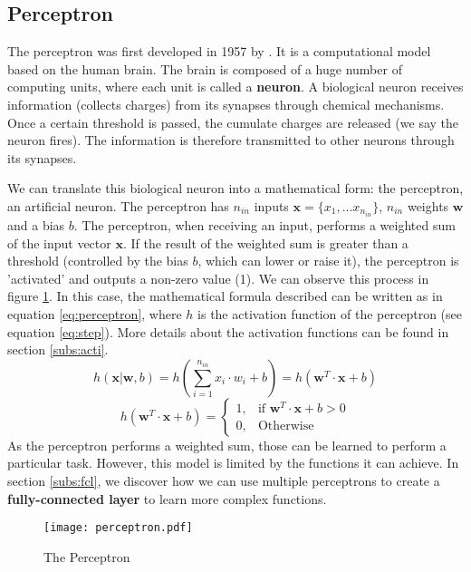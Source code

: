 \subsection{Perceptron} \label{subs:perceptron}
The perceptron was first developed in 1957 by \textcite{brain_perceptron_nodate}. It is a computational model based on the human brain. The brain is composed of a huge number of computing units, where each unit is called a \textbf{neuron}. A biological neuron receives information (collects charges) from its synapses through chemical mechanisms. Once a certain threshold is passed, the cumulate charges are released (we say the neuron fires). The information is therefore transmitted to other neurons through its synapses.

We can translate this biological neuron into a mathematical form: the perceptron, an artificial neuron. The perceptron has $n_{in}$ inputs $\boldsymbol{x} = \{ x_1, ... x_{n_{in}} \}$, $n_{in}$ weights $\boldsymbol{w}$ and a bias $b$. The perceptron, when receiving an input, performs a weighted sum of the input vector $\boldsymbol{x}$. If the result of the weighted sum is greater than a threshold (controlled by the bias $b$, which can lower or raise it), the perceptron is 'activated' and outputs a non-zero value (1). We can observe this process in figure \ref{fig:perceptron}.
In this case, the mathematical formula described can be written as in equation \ref{eq:perceptron}, where $h$ is the activation function of the perceptron (see equation \ref{eq:step}). More details about the activation functions can be found in section \ref{subs:acti}.
%
\begin{equation}
    h ( \boldsymbol{x} | \boldsymbol{w}, b) = h(\sum^{n_{in}}_{i=1} x_i \cdot w_i + b) = h ( \boldsymbol{w}^{T} \cdot \boldsymbol{x} + b)
    \label{eq:perceptron}
\end{equation}
%
\begin{equation}
    h ( \boldsymbol{w}^{T} \cdot \boldsymbol{x} + b) = \begin{cases} 1, & \mbox{if } \boldsymbol{w}^{T} \cdot \boldsymbol{x} + b > 0 \\ 0, & \mbox{Otherwise} \end{cases}
    \label{eq:step}
\end{equation}
%
As the perceptron performs a weighted sum, those can be learned to perform a particular task. However, this model is limited by the functions it can achieve. In section \ref{subs:fcl}, we discover how we can use multiple perceptrons to create a \textbf{fully-connected layer} to learn more complex functions.
%
\begin{figure}
    \centering
    \texttt{[image: perceptron.pdf]}
    \caption{The Perceptron}
    \label{fig:perceptron}
\end{figure}
